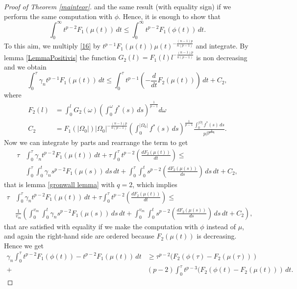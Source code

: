 \documentclass[12pt]{article}
\newcommand{\abs}[1]{{\left|#1\right|}}
\theoremstyle{definition}
\theoremstyle{plain}
\theoremstyle{definition}
\begin{document}
\begin{proof}[Proof of Theorem \ref{mainteor}]
    and the same result (with equality sign) if we perform the same computation with $\phi$. Hence, it is enough to show that
    \begin{equation*}
        \int_0^\infty t^{p-2}F_1(\mu(t))\,dt\leq\int_0^\infty t^{p-2}F_1(\phi(t))\,dt.
    \end{equation*}
    To this aim, we multiply \eqref{16} by $t^{p-1}F_1(\mu(t))\mu(t)^{-\frac{(n-1)p}{n(p-1)}}$ and integrate. By lemma \ref{LemmaPositivis} the function $G_2(l)=F_1(l)l^{-\frac{(n-1)p}{n(p-1)}}$ is non decreasing and we obtain
    \begin{equation*}
        \int_0^\tau\gamma_n t^{p-1}F_1(\mu(t))\,dt\leq\int_0^\tau t^{p-1}\left(-\frac{d}{dt}F_2(\mu(t))\right)\,dt+C_2,
    \end{equation*}
    where
    \begin{equation*}
        \begin{split}
            F_2(l)&=\int_0^lG_2(\omega)\left(\int_0^\omega f^*(s)\,ds\right)^\frac{1}{p-1}d\omega\\
            C_2&=F_1(\abs{\Omega_0})\abs{\Omega_0}^{-\frac{(n-1)p}{n(p-1)}}\left(\int_0^{\abs{\Omega_0}}f^*(s)\,ds\right)^\frac{1}{p-1}\frac{\int_0^{\abs{\Omega}} f^*(s)\,ds}{p\beta^\frac{p}{p-1}}.
        \end{split}
    \end{equation*}
    Now we can integrate by parts and rearrange the term to get
    \begin{equation*}
        \begin{split}
            \tau&\int_0^\tau\gamma_nt^{p-2}F_1(\mu(t))\,dt+\tau\int_0^\tau t^{p-2}\left(\frac{dF_2(\mu(t))}{dt}\right)\leq\\&\int_0^\tau\int_0^t\gamma_n s^{p-2}F_1(\mu(s))\,ds\,dt+\int_0^\tau\int_0^t s^{p-2}\left(\frac{dF_2(\mu(s))}{ds}\right)\,ds\,dt+C_2,
        \end{split}
    \end{equation*}
    that is lemma \ref{gronwall lemma} with $q=2$, which implies
    \begin{equation*}
        \begin{split}
            \tau&\int_0^\tau\gamma_nt^{p-2}F_1(\mu(t))\,dt+\tau\int_0^\tau t^{p-2}\left(\frac{dF_2(\mu(t))}{dt}\right)\leq\\ &\frac{1}{v_m}\left(\int_0^{v_m}\int_0^t\gamma_ns^{p-2}F_1(\mu(s))\,ds\,dt+\int_0^{v_m}\int_0^ts^{p-2}\left(\frac{dF_2(\mu(s))}{ds}\right)\,ds\,dt+C_2\right),
        \end{split}
    \end{equation*}
    that are satisfied with equality if we make the computation with $\phi$ instead of $\mu$, and again the right-hand side are ordered because $F_2(\mu(t))$ is decreasing. Hence we get
    \begin{equation}\label{779}
        \begin{split}
            \gamma_n\int_0^\tau t^{p-2}F_1(\phi(t))-t^{p-2}F_1(\mu(t))\,dt&\geq\tau^{p-2}(F_2(\phi(\tau)-F_2(\mu(\tau)))\\+&(p-2)\int_0^\tau t^{p-3}(F_2(\phi(t)-F_2(\mu(t)))\,dt.
        \end{split}
    \end{equation}
    

\end{proof}
\end{document}
